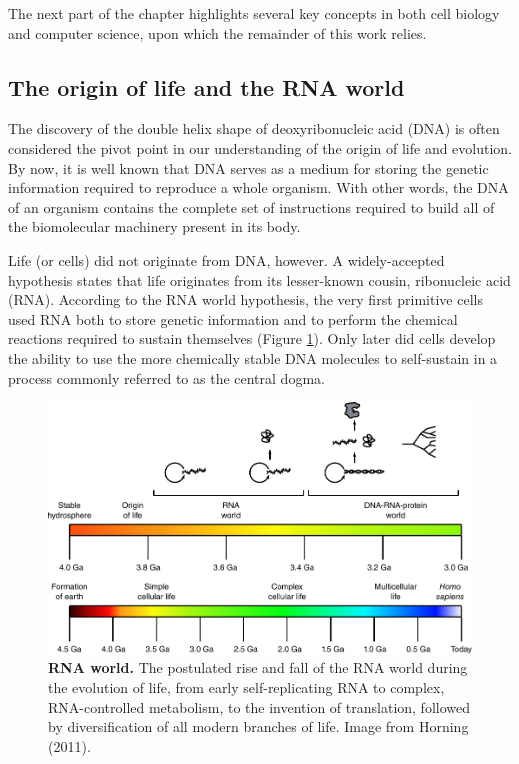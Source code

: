 The next part of the chapter highlights several key concepts in both cell biology and computer science, upon which the remainder of this work relies.

\subsection{The origin of life and the RNA world}
The discovery of the double helix shape of deoxyribonucleic acid (DNA)\cite{watson_molecularstructurenucleic_1953} is often considered the pivot point in our understanding of the origin of life and evolution. By now, it is well known that DNA serves as a medium for storing the genetic information required to reproduce a whole organism. With other words, the DNA of an organism contains the complete set of instructions required to build all of the biomolecular machinery present in its body. 

Life (or cells) did not originate from DNA, however. A widely-accepted hypothesis states that life originates from its lesser-known cousin, ribonucleic acid (RNA). According to the RNA world hypothesis\cite{alberts_rnaworldorigins_2002}, the very first primitive cells used RNA both to store genetic information and to perform the chemical reactions required to sustain themselves (Figure \ref{fig:rnaworld}). Only later did cells develop the ability to use the more chemically stable DNA molecules to self-sustain in a process commonly referred to as the central dogma.

\begin{figure}[htb!]
	\centering
	\includegraphics[width=.8\linewidth]{fig/rnaworld} %
	\caption{
		\textbf{RNA world.} The postulated rise and fall of the RNA world during the evolution of life, from early self-replicating RNA to complex, RNA-controlled metabolism, to the invention of translation, followed by diversification of all modern branches of life. Image from Horning (2011)\cite{horning_rnaworld_2011}.
	}
	\label{fig:rnaworld}
\end{figure}

